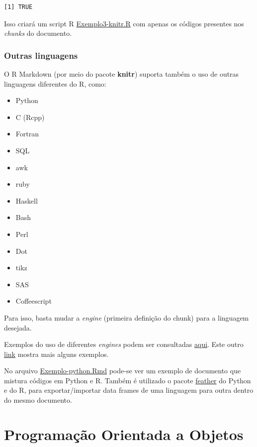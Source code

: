 \documentclass[
  10pt,
  a4paper]{book}
\providecommand{\tightlist}{%
  \setlength{\itemsep}{0pt}\setlength{\parskip}{0pt}}
\begin{document}
\begin{verbatim}
[1] TRUE
\end{verbatim}

Isso criará um script R \href{exemplos/Exemplo3-knitr.R}{Exemplo3-knitr.R}
com apenas os códigos presentes nos \emph{chunks} do documento.

\hypertarget{outras-linguagens}{%
\subsection{Outras linguagens}\label{outras-linguagens}}

O R Markdown (por meio do pacote \textbf{knitr}) suporta também o uso de
outras linguagens diferentes do R, como:

\begin{itemize}
\tightlist
\item
  Python
\item
  C (Rcpp)
\item
  Fortran
\item
  SQL
\item
  awk
\item
  ruby
\item
  Haskell
\item
  Bash
\item
  Perl
\item
  Dot
\item
  tikz
\item
  SAS
\item
  Coffeescript
\end{itemize}

Para isso, basta mudar a \emph{engine} (primeira definição do chunk) para a
linguagem desejada.

Exemplos do uso de diferentes \emph{engines} podem ser consultadas
\href{https://yihui.name/knitr/demo/engines/}{aqui}. Este outro
\href{https://rmarkdown.rstudio.com/authoring_knitr_engines.html}{link}
mostra mais alguns exemplos.

No arquivo \href{exemplos/Exemplo-python.Rmd}{Exemplo-python.Rmd} pode-se ver
um exemplo de documento que mistura códigos em Python e R. Também é
utilizado o pacote
\href{https://blog.rstudio.com/2016/03/29/feather/}{feather} do Python e do
R, para exportar/importar data frames de uma linguagem para outra dentro
do mesmo documento.

\hypertarget{programauxe7uxe3o-orientada-a-objetos}{%
\chapter{Programação Orientada a Objetos}\label{programauxe7uxe3o-orientada-a-objetos}}
\end{document}
